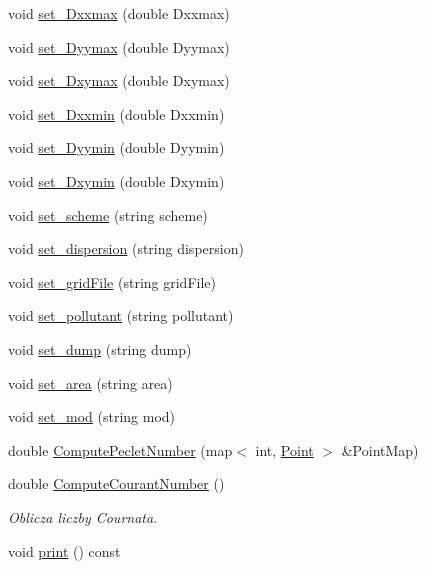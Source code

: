 \begin{DoxyCompactItemize}
\item 
void \hyperlink{class_simulation_parameters_a2c55847f253f98af295b89f32aa4cc1c}{set\+\_\+\+Dxxmax} (double Dxxmax)
\item 
void \hyperlink{class_simulation_parameters_a7337f50ff0f37ac9936f3586016661bf}{set\+\_\+\+Dyymax} (double Dyymax)
\item 
void \hyperlink{class_simulation_parameters_a93877f3fd2e247afa730d63dd338f4c4}{set\+\_\+\+Dxymax} (double Dxymax)
\item 
void \hyperlink{class_simulation_parameters_a9a213f854271721cf381ef08d03b805b}{set\+\_\+\+Dxxmin} (double Dxxmin)
\item 
void \hyperlink{class_simulation_parameters_a26a229a4abb16fd60b9904091b56bd48}{set\+\_\+\+Dyymin} (double Dyymin)
\item 
void \hyperlink{class_simulation_parameters_a5f1a3d9b5357192cdea0da48d37330cc}{set\+\_\+\+Dxymin} (double Dxymin)
\item 
void \hyperlink{class_simulation_parameters_a8e17dae834cc3339bc4b35e1085cb09c}{set\+\_\+scheme} (string scheme)
\item 
void \hyperlink{class_simulation_parameters_a19725775b57442ed6b0b07251c26ed5d}{set\+\_\+dispersion} (string dispersion)
\item 
void \hyperlink{class_simulation_parameters_ab17f56dbd5bfcfadd13b55665b27222f}{set\+\_\+grid\+File} (string grid\+File)
\item 
void \hyperlink{class_simulation_parameters_a76420499d58b303411f21c385d82303f}{set\+\_\+pollutant} (string pollutant)
\item 
void \hyperlink{class_simulation_parameters_a1848a63487254ccce60bc06886d29847}{set\+\_\+dump} (string dump)
\item 
void \hyperlink{class_simulation_parameters_a05862812dec3b947f124886aaea1cb84}{set\+\_\+area} (string area)
\item 
void \hyperlink{class_simulation_parameters_a16d7b0beff55cf45ca7cf23d99fbbd10}{set\+\_\+mod} (string mod)
\item 
double \hyperlink{class_simulation_parameters_a2a4c6b2a5528a18a0181e343be735876}{Compute\+Peclet\+Number} (map$<$ int, \hyperlink{class_point}{Point} $>$ \&Point\+Map)
\item 
double \hyperlink{class_simulation_parameters_a8b6b920edd7ab4f094ffd735381caddf}{Compute\+Courant\+Number} ()
\begin{DoxyCompactList}\small\item\em Oblicza liczby Cournata. \end{DoxyCompactList}\item 
void \hyperlink{class_simulation_parameters_a23c2b9bb9465abbbeb2050dbe50d9ef6}{print} () const 
\end{DoxyCompactItemize}


